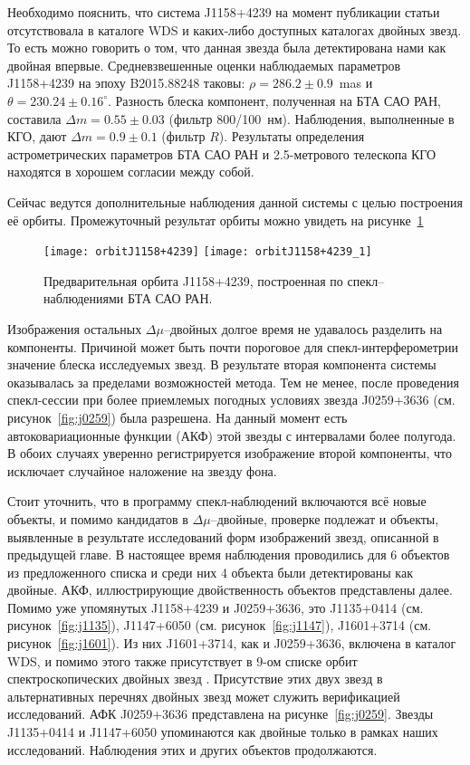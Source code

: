 Необходимо пояснить, что система J1158+4239 на момент публикации статьи отсутствовала в каталоге WDS и каких-либо доступных каталогах двойных звезд. То есть можно говорить о том, что данная звезда была детектирована нами как двойная впервые. Средневзвешенные оценки наблюдаемых параметров J1158+4239 на  эпоху B2015.88248 таковы: $\rho = 286.2\pm0.9$~mas и $\theta=230.24\pm0.16^\circ$. Разность блеска компонент, полученная на БТА САО РАН, составила $\Delta m = 0.55\pm0.03$ (фильтр 800/100~нм). Наблюдения, выполненные в КГО, дают $\Delta m = 0.9\pm0.1$ (фильтр $R$). Результаты определения астрометрических параметров БТА САО РАН и 2.5-метрового телескопа КГО находятся в хорошем согласии между собой.  

Сейчас ведутся дополнительные наблюдения данной системы с целью построения её орбиты. Промежуточный результат орбиты можно увидеть на рисунке~\ref{fig:orbit}


\begin{figure}
\centering
\texttt{[image: orbitJ1158+4239]}
\texttt{[image: orbitJ1158+4239\_1]}
\caption{Предварительная орбита J1158+4239, построенная по спекл--наблюдениями БТА САО РАН.}
\label{fig:orbit}
\end{figure}


Изображения остальных $\Delta\mu$--двойных долгое время не удавалось разделить на компоненты. Причиной может быть почти пороговое для спекл-интерферометрии значение блеска исследуемых звезд. В результате вторая компонента системы оказывалась за пределами возможностей метода. Тем не менее, после проведения спекл-сессии при более приемлемых погодных условиях звезда  J0259+3636 (см. рисунок~\ref{fig:j0259}) была разрешена. На данный момент есть автоковариационные функции (АКФ) этой звезды с интервалами более полугода. В обоих случаях уверенно регистрируется изображение второй компоненты, что исключает случайное наложение на звезду фона.

Стоит уточнить, что в программу спекл-наблюдений включаются всё новые объекты, и помимо кандидатов в $\Delta\mu$--двойные, проверке подлежат и объекты, выявленные в результате исследований форм изображений звезд, описанной в предыдущей главе. В настоящее время наблюдения проводились для 6 объектов из предложенного списка и среди них  4 объекта были детектированы как двойные. АКФ, иллюстрирующие двойственность объектов представлены далее. Помимо уже упомянутых J1158+4239 и J0259+3636, это  J1135+0414 (см. рисунок~\ref{fig:j1135}), J1147+6050 (см. рисунок~\ref{fig:j1147}), J1601+3714 (см. рисунок~\ref{fig:j1601}). Из них  J1601+3714, как и J0259+3636, включена в каталог WDS, и помимо этого также присутствует в 9-ом списке орбит спектроскопических двойных звезд \cite{2004A&A...424..727P}. Присутствие этих двух звезд в альтернативных перечнях двойных звезд может служить верификацией исследований. АФК J0259+3636 представлена на рисунке~\ref{fig:j0259}. Звезды J1135+0414 и J1147+6050 упоминаются как двойные только в рамках наших исследований. Наблюдения этих и других объектов продолжаются.

